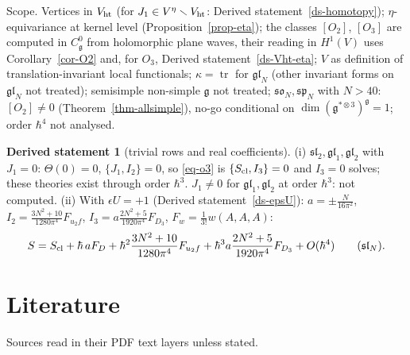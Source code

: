 \documentclass[10pt,a4paper]{article}
\numberwithin{equation}{section}
\theoremstyle{definition}
\newtheorem{dstatement}[theorem]{Derived statement}
\theoremstyle{remark}
\newcommand{\tr}{\operatorname{tr}}
\newcommand{\g}{\mathfrak g}
\newcommand{\fsl}{\mathfrak{sl}}
\newcommand{\fgl}{\mathfrak{gl}}
\newcommand{\fso}{\mathfrak{so}}
\newcommand{\fsp}{\mathfrak{sp}}
\newcommand{\Vht}{V_{\rm ht}}
\newcommand{\Veta}{V^{\eta}}
\newcommand{\Cg}{C^0_{\g}}
\newcommand{\uf}{u_2f}
\newcommand{\Dthree}{D_3}
\begin{document}
Scope. Vertices in $\Vht$ (for $J_1\in\Veta\smallsetminus\Vht$: Derived statement~\ref{ds-homotopy}); $\eta$-equivariance at kernel level (Proposition~\ref{prop-eta}); the classes $[O_2]$, $[O_3]$ are computed in $\Cg$ from holomorphic plane waves, their reading in $H^1(V)$ uses Corollary~\ref{cor-O2} and, for $O_3$, Derived statement~\ref{ds-Vht-eta}; $V$ as definition of translation-invariant local functionals; $\kappa=\tr$ for $\fgl_N$ (other invariant forms on $\fgl_N$ not treated); semisimple non-simple $\g$ not treated; $\fso_N,\fsp_N$ with $N>40$: $[O_2]\neq0$ (Theorem~\ref{thm-allsimple}), no-go conditional on $\dim(\g^{*\otimes3})^\g=1$; order $\hbar^4$ not analysed.

\begin{dstatement}[trivial rows and real coefficients]\label{ds-trivial}
(i) $\fsl_2,\fgl_1,\fgl_2$ with $J_1=0$: $\Theta(0)=0$, $\{J_1,I_2\}=0$, so \eqref{eq-o3} is $\{S_{\rm cl},I_3\}=0$ and $I_3=0$ solves; these theories exist through order $\hbar^3$. $J_1\ne0$ for $\fgl_1,\fgl_2$ at order $\hbar^3$: not computed. (ii) With $\epsilon U=+1$ (Derived statement~\ref{ds-epsU}): $a=\pm\frac N{16\pi^2}$, $I_2=\frac{3N^2+10}{1280\pi^4}F_{\uf}$, $I_3=a\frac{2N^2+5}{1920\pi^4}F_{\Dthree}$, $F_w=\frac1{3!}w(A,A,A)$:
\begin{equation}
S=S_{\rm cl}+\hbar\,aF_D+\hbar^2\frac{3N^2+10}{1280\pi^4}F_{\uf}+\hbar^3a\frac{2N^2+5}{1920\pi^4}F_{\Dthree}+O(\hbar^4)\qquad(\fsl_N).
\end{equation}
\end{dstatement}

\section{Literature}\label{sec-lit}

Sources read in their PDF text layers unless stated.
\end{document}
